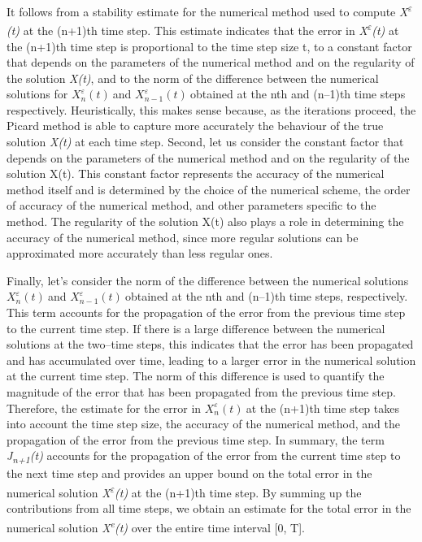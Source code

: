 \documentclass[12pt,a4paper]{report}
\numberwithin{equation}{section}
\begin{document}
It follows from a stability estimate for the numerical method used to
compute \emph{X\textsuperscript{$\varepsilon$}(t)} at the (n+1)th time step. This
estimate indicates that the error in \emph{X\textsuperscript{$\varepsilon$}(t)} at
the (n+1)th time step is proportional to the time step size t, to a
constant factor that depends on the parameters of the numerical method
and on the regularity of the solution \emph{X(t)}, and to the norm of
the difference between the numerical solutions for
\(X_{n}^{\varepsilon}(t)\ \)and \(X_{n - 1}^{\varepsilon}(t)\ \)obtained
at the nth and (n--1)th time steps respectively. Heuristically, this
makes sense because, as the iterations proceed, the Picard method is
able to capture more accurately the behaviour of the true solution
\emph{X(t)} at each time step. Second, let us consider the constant
factor that depends on the parameters of the numerical method and on the
regularity of the solution X(t). This constant factor represents the
accuracy of the numerical method itself and is determined by the choice
of the numerical scheme, the order of accuracy of the numerical method,
and other parameters specific to the method. The regularity of the
solution X(t) also plays a role in determining the accuracy of the
numerical method, since more regular solutions can be approximated more
accurately than less regular ones.

Finally, let's consider the norm of the difference between the numerical
solutions \(X_{n}^{\varepsilon}(t)\ \)and
\(X_{n - 1}^{\varepsilon}(t)\ \)obtained at the nth and (n--1)th time
steps, respectively. This term accounts for the propagation of the error
from the previous time step to the current time step. If there is a
large difference between the numerical solutions at the two--time steps,
this indicates that the error has been propagated and has accumulated
over time, leading to a larger error in the numerical solution at the
current time step. The norm of this difference is used to quantify the
magnitude of the error that has been propagated from the previous time
step. Therefore, the estimate for the error in
\(X_{n}^{\varepsilon}(t)\ \)at the (n+1)th time step takes into account
the time step size, the accuracy of the numerical method, and the
propagation of the error from the previous time step. In summary, the
term \emph{J\textsubscript{n+1}(t)} accounts for the propagation of the
error from the current time step to the next time step and provides an
upper bound on the total error in the numerical solution
\emph{X\textsuperscript{$\varepsilon$}(t)} at the (n+1)th time step. By summing up
the contributions from all time steps, we obtain an estimate for the
total error in the numerical solution \emph{X\textsuperscript{e}(t)}
over the entire time interval {[}0, T{]}.
\end{document}
